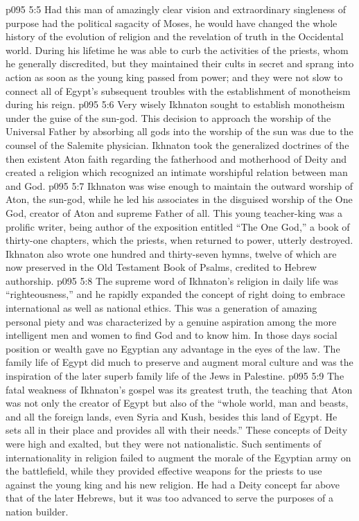 \vs p095 5:5 Had this man of amazingly clear vision and extraordinary singleness of purpose had the political sagacity of Moses, he would have changed the whole history of the evolution of religion and the revelation of truth in the Occidental world. During his lifetime he was able to curb the activities of the priests, whom he generally discredited, but they maintained their cults in secret and sprang into action as soon as the young king passed from power; and they were not slow to connect all of Egypt’s subsequent troubles with the establishment of monotheism during his reign.
\vs p095 5:6 Very wisely Ikhnaton sought to establish monotheism under the guise of the sun\hyp{}god. This decision to approach the worship of the Universal Father by absorbing all gods into the worship of the sun was due to the counsel of the Salemite physician. Ikhnaton took the generalized doctrines of the then existent Aton faith regarding the fatherhood and motherhood of Deity and created a religion which recognized an intimate worshipful relation between man and God.
\vs p095 5:7 Ikhnaton was wise enough to maintain the outward worship of Aton, the sun\hyp{}god, while he led his associates in the disguised worship of the One God, creator of Aton and supreme Father of all. This young teacher\hyp{}king was a prolific writer, being author of the exposition entitled “The One God,” a book of thirty\hyp{}one chapters, which the priests, when returned to power, utterly destroyed. Ikhnaton also wrote one hundred and thirty\hyp{}seven hymns, twelve of which are now preserved in the Old Testament Book of Psalms, credited to Hebrew authorship.
\pc \vs p095 5:8 The supreme word of Ikhnaton’s religion in daily life was “righteousness,” and he rapidly expanded the concept of right doing to embrace international as well as national ethics. This was a generation of amazing personal piety and was characterized by a genuine aspiration among the more intelligent men and women to find God and to know him. In those days social position or wealth gave no Egyptian any advantage in the eyes of the law. The family life of Egypt did much to preserve and augment moral culture and was the inspiration of the later superb family life of the Jews in Palestine.
\vs p095 5:9 The fatal weakness of Ikhnaton’s gospel was its greatest truth, the teaching that Aton was not only the creator of Egypt but also of the “whole world, man and beasts, and all the foreign lands, even Syria and Kush, besides this land of Egypt. He sets all in their place and provides all with their needs.” These concepts of Deity were high and exalted, but they were not nationalistic. Such sentiments of internationality in religion failed to augment the morale of the Egyptian army on the battlefield, while they provided effective weapons for the priests to use against the young king and his new religion. He had a Deity concept far above that of the later Hebrews, but it was too advanced to serve the purposes of a nation builder.
